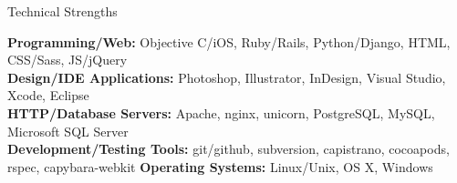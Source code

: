 \documentclass{resume} %
\begin{document}

\begin{rSection}{Technical Strengths}

\textbf{Programming/Web:} Objective C/iOS, Ruby/Rails, Python/Django, HTML, CSS/Sass, JS/jQuery \\
\textbf{Design/IDE Applications:} Photoshop, Illustrator, InDesign, Visual Studio, Xcode, Eclipse  \\
\textbf{HTTP/Database Servers:} Apache, nginx, unicorn, PostgreSQL, MySQL, Microsoft SQL Server  \\
\textbf{Development/Testing Tools:} git/github, subversion, capistrano, cocoapods, rspec, capybara-webkit
\textbf{Operating Systems:} Linux/Unix, OS X, Windows

\end{rSection}

\end{document}
